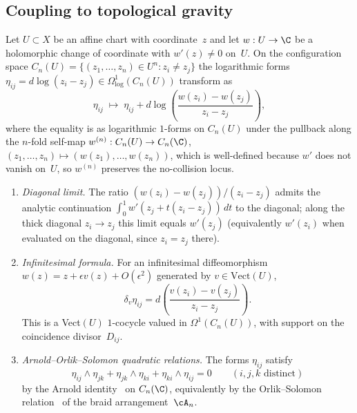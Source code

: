 \subsection{Coupling to topological gravity}

\begin{theorem}
\label{thm:log-form-ghost-law}
Let $U \subset X$ be an affine chart with coordinate~$z$ and let
$w : U \to \C$ be a holomorphic change of coordinate with
$w'(z) \neq 0$ on~$U$. On the configuration space
$C_n(U) = \{(z_1,\dots,z_n) \in U^n : z_i \neq z_j\}$ the logarithmic
forms $\eta_{ij} = d\log(z_i - z_j) \in \Omega^{1}_{\log}(C_n(U))$
transform as
\begin{equation}\label{eq:eta-transformation}
\eta_{ij} \;\mapsto\; \eta_{ij}
+ d\log\!\left(\frac{w(z_i) - w(z_j)}{z_i - z_j}\right),
\end{equation}
where the equality is as logarithmic $1$-forms on $C_n(U)$
under the pullback along the $n$-fold self-map
$w^{(n)} : C_n(U) \to C_n(\C)$,
$(z_1,\dots,z_n) \mapsto (w(z_1),\dots,w(z_n))$,
which is well-defined because $w'$ does not vanish on~$U$, so
$w^{(n)}$ preserves the no-collision locus.
\begin{enumerate}[label=\textup{(\roman*)}]
\item \emph{Diagonal limit.} The ratio
$(w(z_i) - w(z_j))/(z_i - z_j)$ admits the analytic continuation
$\int_0^1 w'(z_j + t(z_i - z_j))\,dt$ to the diagonal; along the
thick diagonal $z_i \to z_j$ this limit equals $w'(z_j)$
(equivalently $w'(z_i)$ when evaluated on the diagonal, since
$z_i = z_j$ there).
\item \emph{Infinitesimal formula.} For an infinitesimal
diffeomorphism $w(z) = z + \epsilon v(z) + O(\epsilon^2)$ generated
by $v \in \mathrm{Vect}(U)$,
\begin{equation}\label{eq:delta-v-eta}
\delta_v \eta_{ij}
= d\!\left(\frac{v(z_i) - v(z_j)}{z_i - z_j}\right).
\end{equation}
This is a Vect$(U)$ $1$-cocycle valued in $\Omega^{1}(C_n(U))$,
with support on the coincidence divisor~$D_{ij}$.
\item \emph{Arnold--Orlik--Solomon quadratic relations.} The forms
$\eta_{ij}$ satisfy
\begin{equation}\label{eq:arnold-3term}
\eta_{ij} \wedge \eta_{jk} + \eta_{jk} \wedge \eta_{ki}
+ \eta_{ki} \wedge \eta_{ij} = 0
\qquad (i,j,k \text{ distinct})
\end{equation}
by the Arnold identity~\cite{Arnold69} on
$C_n(\C)$, equivalently by the Orlik--Solomon
relation~\cite{OrlSol80} of the braid
arrangement~$\cA_n$.
\end{enumerate}
\end{theorem}

